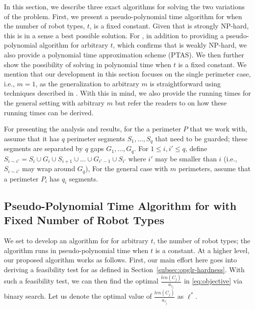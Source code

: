 In this section, we describe three exact algorithms for solving the two 
variations of the \opg problem. First, we present a pseudo-polynomial time
algorithm for \opglr when the number of robot types, $t$, is a fixed constant. 
Given that \opglr is strongly NP-hard, this is in a sense a best possible 
solution. 
%
For \opgmc, in addition to providing a pseudo-polynomial algorithm for 
arbitrary $t$, which confirms that \opgmc is weakly NP-hard, we also provide
a polynomial time approximation scheme (PTAS). We then further show the 
possibility of solving \opgmc in polynomial time when $t$ is a fixed constant. 
We mention that our development in this section focuses on the single 
perimeter case, i.e., $m = 1$, as the generalization to arbitrary $m$ is 
straightforward using techniques described in \cite{FenHanGaoYu19RSS}. With this in mind, 
we also provide the running times for the general setting with arbitrary $m$ 
but refer the readers to \cite{FenHanGaoYu19RSS} on how these running times can be derived. 

For presenting the analysis and results, for the a perimeter $P$ that we work 
with, assume that it has $q$ perimeter segments $S_1, \ldots, S_q$ that need 
to be guarded; these segments are separated by $q$ gaps $G_1, \ldots, G_q$. 
For $1 \le i, i' \le q$, define $S_{i\sim i'} = S_i \cup G_i \cup S_{i+1} \cup \ldots 
\cup G_{i'-1} \cup S_{i'}$ where $i'$ may be smaller than $i$ (i.e., $S_{i\sim i'}$
may wrap around $G_q$),
For the general case with $m$ perimeters, assume that a perimeter $P_i$ has
$q_i$ segments. 
\begin{comment}
\jy{A paper, or anything with some level of complexity to digest, should be 
hierarchical. So, at the beginning of a section, it is good to explain a bit 
of what will be covered so a reader will have an idea of the structure of 
the section.}
\end{comment}

\subsection{Pseudo-Polynomial Time Algorithm for \opglr with Fixed Number
of Robot Types}
\def\inc{{\sc Inc}\xspace}
\def\knapsack{\textbf{\textsc{Knapsack}}\xspace}
\def\opglrfeasible{{\sc OPG-lr-Feasible}\xspace}
\def\opgmcdp{{\sc OPG-mc-DP}\xspace}
We set to develop an algorithm for \opglr for arbitrary $t$, the number of robot 
types; the algorithm runs in pseudo-polynomial time when $t$ is a constant. 
At a higher level, our proposed algorithm works as follows. First, our main effort 
here goes into deriving a feasibility test for \opglrd as defined in 
Section~\ref{subsec:opglr-hardness}. With such a feasibility test, we can then 
find the optimal $\frac{len(C_j)}{a_{\tau_j}}$ in \eqref{eq:objective} via binary search.
Let us denote the optimal value of $\frac{len(C_j)}{a_{\tau_j}}$ as $\ell^*$. 

